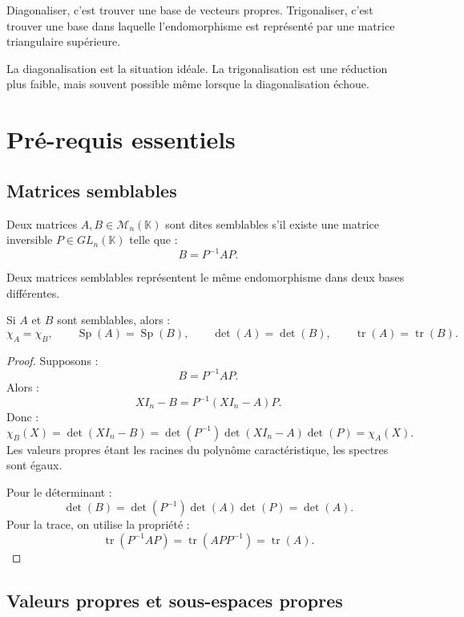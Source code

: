 \documentclass[11pt,a4paper]{article}
\newcommand{\K}{\mathbb K}
\newcommand{\M}{\mathcal M}
\newcommand{\tr}{\operatorname{tr}}
\newcommand{\Sp}{\operatorname{Sp}}
\begin{document}
\begin{retenirbox}
Diagonaliser, c'est trouver une base de vecteurs propres.  
Trigonaliser, c'est trouver une base dans laquelle l'endomorphisme est représenté par une matrice triangulaire supérieure.
\end{retenirbox}

La diagonalisation est la situation idéale.  
La trigonalisation est une réduction plus faible, mais souvent possible même lorsque la diagonalisation échoue.

\section{Pré-requis essentiels}

\subsection{Matrices semblables}

\begin{definitionbox}
Deux matrices \(A,B\in\M_n(\K)\) sont dites semblables s'il existe une matrice inversible \(P\in GL_n(\K)\) telle que :
\[
B=P^{-1}AP.
\]
\end{definitionbox}

\begin{retenirbox}
Deux matrices semblables représentent le même endomorphisme dans deux bases différentes.
\end{retenirbox}

\begin{theorembox}
Si \(A\) et \(B\) sont semblables, alors :
\[
\chi_A=\chi_B,
\qquad
\Sp(A)=\Sp(B),
\qquad
\det(A)=\det(B),
\qquad
\tr(A)=\tr(B).
\]
\end{theorembox}

\begin{proof}
Supposons :
\[
B=P^{-1}AP.
\]
Alors :
\[
XI_n-B=P^{-1}(XI_n-A)P.
\]
Donc :
\[
\chi_B(X)=\det(XI_n-B)
=
\det(P^{-1})\det(XI_n-A)\det(P)
=
\chi_A(X).
\]
Les valeurs propres étant les racines du polynôme caractéristique, les spectres sont égaux.

Pour le déterminant :
\[
\det(B)=\det(P^{-1})\det(A)\det(P)=\det(A).
\]
Pour la trace, on utilise la propriété :
\[
\tr(P^{-1}AP)=\tr(APP^{-1})=\tr(A).
\]
\end{proof}

\subsection{Valeurs propres et sous-espaces propres}
\end{document}
